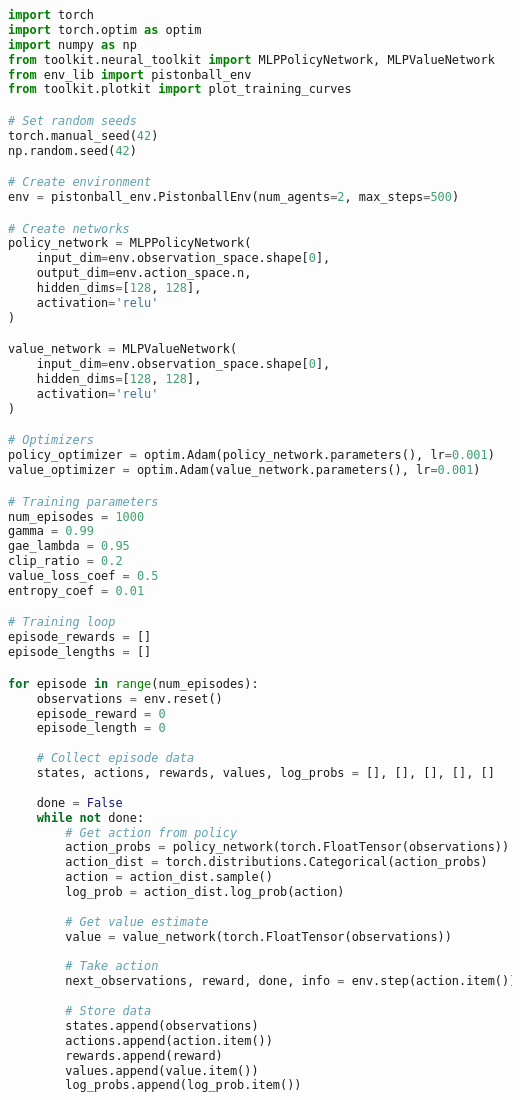 \begin{lstlisting}[language=python, caption=Basic PPO Training]
import torch
import torch.optim as optim
import numpy as np
from toolkit.neural_toolkit import MLPPolicyNetwork, MLPValueNetwork
from env_lib import pistonball_env
from toolkit.plotkit import plot_training_curves

# Set random seeds
torch.manual_seed(42)
np.random.seed(42)

# Create environment
env = pistonball_env.PistonballEnv(num_agents=2, max_steps=500)

# Create networks
policy_network = MLPPolicyNetwork(
    input_dim=env.observation_space.shape[0],
    output_dim=env.action_space.n,
    hidden_dims=[128, 128],
    activation='relu'
)

value_network = MLPValueNetwork(
    input_dim=env.observation_space.shape[0],
    hidden_dims=[128, 128],
    activation='relu'
)

# Optimizers
policy_optimizer = optim.Adam(policy_network.parameters(), lr=0.001)
value_optimizer = optim.Adam(value_network.parameters(), lr=0.001)

# Training parameters
num_episodes = 1000
gamma = 0.99
gae_lambda = 0.95
clip_ratio = 0.2
value_loss_coef = 0.5
entropy_coef = 0.01

# Training loop
episode_rewards = []
episode_lengths = []

for episode in range(num_episodes):
    observations = env.reset()
    episode_reward = 0
    episode_length = 0
    
    # Collect episode data
    states, actions, rewards, values, log_probs = [], [], [], [], []
    
    done = False
    while not done:
        # Get action from policy
        action_probs = policy_network(torch.FloatTensor(observations))
        action_dist = torch.distributions.Categorical(action_probs)
        action = action_dist.sample()
        log_prob = action_dist.log_prob(action)
        
        # Get value estimate
        value = value_network(torch.FloatTensor(observations))
        
        # Take action
        next_observations, reward, done, info = env.step(action.item())
        
        # Store data
        states.append(observations)
        actions.append(action.item())
        rewards.append(reward)
        values.append(value.item())
        log_probs.append(log_prob.item())
        

\end{lstlisting}
